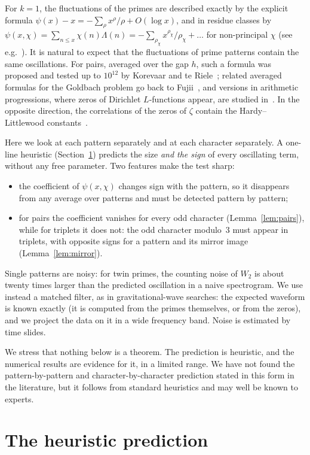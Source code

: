 \documentclass[11pt]{amsart}
\theoremstyle{remark}
\begin{document}
For $k=1$, the fluctuations of the primes are described exactly by the explicit formula $\psi(x)-x=-\sum_\rho x^\rho/\rho+O(\log x)$, and in residue classes by $\psi(x,\chi)=\sum_{n\le x}\chi(n)\Lambda(n)=-\sum_{\rho_\chi}x^{\rho_\chi}/\rho_\chi+\dots$ for non-principal $\chi$ (see e.g.~\cite{Davenport}). It is natural to expect that the fluctuations of prime patterns contain the same oscillations. For pairs, averaged over the gap $h$, such a formula was proposed and tested up to $10^{12}$ by Korevaar and te Riele~\cite{KtR}; related averaged formulas for the Goldbach problem go back to Fujii~\cite{Fujii}, and versions in arithmetic progressions, where zeros of Dirichlet $L$-functions appear, are studied in~\cite{Suzuki,BHMS}. In the opposite direction, the correlations of the zeros of $\zeta$ contain the Hardy--Littlewood constants~\cite{BK,KS}.

Here we look at each pattern separately and at each character separately. A one-line heuristic (Section~\ref{sec:heur}) predicts the size \emph{and the sign} of every oscillating term, without any free parameter. Two features make the test sharp:
\begin{itemize}
\item the coefficient of $\psi(x,\chi)$ changes sign with the pattern, so it disappears from any average over patterns and must be detected pattern by pattern;
\item for pairs the coefficient vanishes for every odd character (Lemma~\ref{lem:pairs}), while for triplets it does not: the odd character modulo~$3$ must appear in triplets, with opposite signs for a pattern and its mirror image (Lemma~\ref{lem:mirror}).
\end{itemize}
Single patterns are noisy: for twin primes, the counting noise of $W_2$ is about twenty times larger than the predicted oscillation in a naive spectrogram. We use instead a matched filter, as in gravitational-wave searches: the expected waveform is known exactly (it is computed from the primes themselves, or from the zeros), and we project the data on it in a wide frequency band. Noise is estimated by time slides.

We stress that nothing below is a theorem. The prediction is heuristic, and the numerical results are evidence for it, in a limited range. We have not found the pattern-by-pattern and character-by-character prediction stated in this form in the literature, but it follows from standard heuristics and may well be known to experts.

\section{The heuristic prediction}\label{sec:heur}
\end{document}
